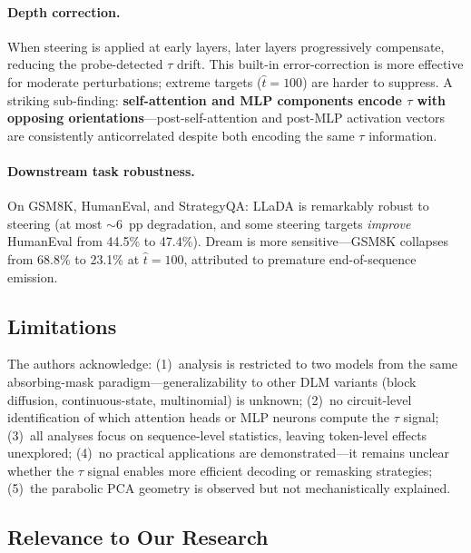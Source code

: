 \documentclass[11pt,a4paper]{article}
\begin{document}
\paragraph{Depth correction.}
When steering is applied at early layers, later layers progressively compensate, reducing the probe-detected $\tau$ drift. This built-in error-correction is more effective for moderate perturbations; extreme targets ($\hat{t} = 100$) are harder to suppress. A striking sub-finding: \textbf{self-attention and MLP components encode $\tau$ with opposing orientations}---post-self-attention and post-MLP activation vectors are consistently anticorrelated despite both encoding the same $\tau$ information.

\paragraph{Downstream task robustness.}
On GSM8K, HumanEval, and StrategyQA: LLaDA is remarkably robust to steering (at most $\sim$6~pp degradation, and some steering targets \emph{improve} HumanEval from 44.5\% to 47.4\%). Dream is more sensitive---GSM8K collapses from 68.8\% to 23.1\% at $\hat{t} = 100$, attributed to premature end-of-sequence emission.

\subsection{Limitations}

The authors acknowledge: (1)~analysis is restricted to two models from the same absorbing-mask paradigm---generalizability to other DLM variants (block diffusion, continuous-state, multinomial) is unknown; (2)~no circuit-level identification of which attention heads or MLP neurons compute the $\tau$ signal; (3)~all analyses focus on sequence-level statistics, leaving token-level effects unexplored; (4)~no practical applications are demonstrated---it remains unclear whether the $\tau$ signal enables more efficient decoding or remasking strategies; (5)~the parabolic PCA geometry is observed but not mechanistically explained.

\subsection{Relevance to Our Research}
\end{document}
